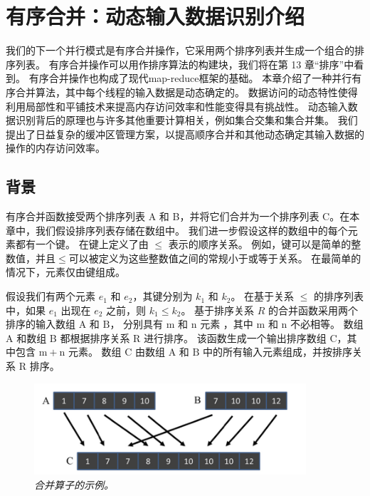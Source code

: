 \section{有序合并：动态输入数据识别介绍}
我们的下一个并行模式是有序合并操作，它采用两个排序列表并生成一个组合的排序列表。 
有序合并操作可以用作排序算法的构建块，我们将在第 13 章“排序”中看到。 有序合并操作也构成了现代map-reduce框架的基础。 
本章介绍了一种并行有序合并算法，其中每个线程的输入数据是动态确定的。 
数据访问的动态特性使得利用局部性和平铺技术来提高内存访问效率和性能变得具有挑战性。 
动态输入数据识别背后的原理也与许多其他重要计算相关，例如集合交集和集合并集。 
我们提出了日益复杂的缓冲区管理方案，以提高顺序合并和其他动态确定其输入数据的操作的内存访问效率。

\subsection{背景}
有序合并函数接受两个排序列表 A 和 B，并将它们合并为一个排序列表 C。在本章中，我们假设排序列表存储在数组中。 
我们进一步假设这样的数组中的每个元素都有一个键。 在键上定义了由 $\leq$ 表示的顺序关系。 
例如，键可以是简单的整数值，并且$\leq$可以被定义为这些整数值之间的常规小于或等于关系。 在最简单的情况下，元素仅由键组成。

假设我们有两个元素 $e_{1}$ 和 $e_{2}$，其键分别为 $k_{1}$ 和 $k_{2}$。 
在基于关系 $\leq$ 的排序列表中，如果 $e_{1}$ 出现在 $e_{2}$ 之前，则 $k_{1} \leq k_{2}$。 
基于排序关系 $R$ 的合并函数采用两个排序的输入数组 $\mathrm{A}$ 和 $\mathrm{B}$，
分别具有 $\mathrm{m}$ 和 $\mathrm{n}$ 元素 ，其中 $\mathrm{m}$ 和 $\mathrm{n}$ 不必相等。 
数组 A 和数组 B 都根据排序关系 $\mathrm{R}$ 进行排序。 
该函数生成一个输出排序数组 $\mathrm{C}$，其中包含 $\mathrm{m}+\mathrm{n}$ 元素。 
数组 $\mathrm{C}$ 由数组 $\mathrm{A}$ 和 $\mathrm{B}$ 中的所有输入元素组成，并按排序关系 $\mathrm{R}$ 排序。

\begin{figure}[H]
	\centering
	\includegraphics[width=0.9\textwidth]{figs/F12.1.png}
	\caption{\textit{合并算子的示例。}}
\end{figure}

